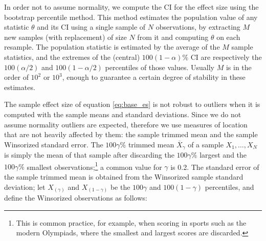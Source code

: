 \documentclass[a4paper,11pt]{kth-mag}
\begin{document}
In order not to assume normality, we compute the CI for the effect size using the bootstrap percentile method. This method estimates the population value of any statistic $\theta$ and its CI using a single sample of $N$ observations, by extracting $M$ new samples (with replacement) of size $N$ from it and computing $\theta$ on each resample. The population statistic is estimated by the average of the $M$ sample statistics, and the extremes of the (central) $100(1-\alpha)\%$ CI are respectively the $100(\alpha/2)$ and $100(1-\alpha/2)$ percentiles of those values. Usually $M$ is in the order of $10^2$ or $10^3$, enough to guarantee a certain degree of stability in these estimates.

The sample effect size of equation \ref{eq:base_es} is not robust to outliers when it is computed with the sample means and standard deviations. Since we do not assume normality outliers are expected, therefore we use measures of location that are not heavily affected by them: the sample trimmed mean and the sample Winsorized standard error. The $100\gamma \%$ trimmed mean $\overline{X}_\gamma$ of a sample $X_1,\ldots,X_N$ is simply the mean of that sample after discarding the $100\gamma\%$ largest and the $100\gamma\%$ smallest observations;\footnote{This is common practice, for example, when scoring in sports such as the modern Olympiads, where the smallest and largest scores are discarded.} a common value for $\gamma$ is 0.2. The standard error of the sample trimmed mean is obtained from the Winsorized sample standard deviation; let $X_{(\gamma)}$ and $X_{(1-\gamma)}$ be the $100\gamma$ and $100(1-\gamma)$ percentiles, and define the Winsorized observations as follows:
\end{document}
